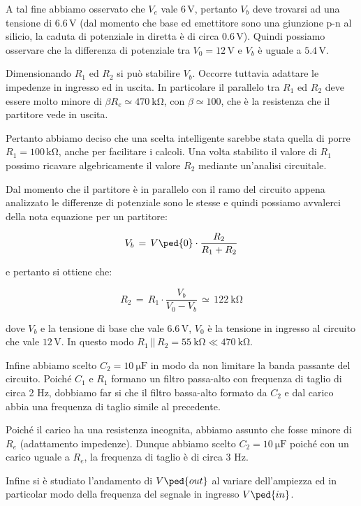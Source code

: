 A tal fine abbiamo osservato che $V_e$ vale $6\,\si{\volt}$, pertanto $V_b$ deve trovarsi ad una tensione di $6.6\,\si{\volt}$ (dal momento che base ed emettitore sono una giunzione p-n al silicio, la caduta di potenziale in diretta è di circa $0.6\,\si{\volt}$). Quindi possiamo osservare che la differenza di potenziale tra $V_0=12\,\si{\volt}$ e $V_b$ è uguale a $5.4\,\si{\volt}$.

Dimensionando $R_1$ ed $R_2$ si può stabilire $V_b$. Occorre tuttavia adattare le impedenze in ingresso ed in uscita. In particolare il parallelo tra $R_1$ ed $R_2$ deve essere molto minore di $\beta R_e \simeq \SI{470}{\kilo\ohm}$, con $\beta \simeq 100$, che è la resistenza che il partitore vede in uscita.

Pertanto abbiamo deciso che una scelta intelligente sarebbe stata quella di porre $R_1 = 100\,\si{\kilo\ohm}$, anche per facilitare i calcoli. Una volta stabilito il valore di $R_1$ possimo ricavare algebricamente il valore $R_2$ mediante un'analisi circuitale.

Dal momento che il partitore è in parallelo con il ramo del circuito appena analizzato le differenze di potenziale sono le stesse e quindi possiamo avvalerci della nota equazione per un partitore:

\begin{equation}
        V_b\,=\,V\ped{0}\cdot\frac{R_2}{R_1+R_2}
\end{equation}

e pertanto si ottiene che:

\begin{equation}
        R_2\,=\,R_1\cdot\frac{V_b}{V_0-V_b} \,\simeq\, \SI{122}{\kilo\ohm}
\end{equation}

dove $V_b$ e la tensione di base che vale $6.6\,\si{\volt}$, $V_0$ è la tensione in ingresso al circuito che vale $12\,\si{\volt}$. In questo modo $R_1\,||\,R_2 = \SI{55}{\kilo\ohm} \ll \SI{470}{\kilo\ohm}$.

Infine abbiamo scelto $C_2 = \SI{10}{\micro\farad}$ in modo da non limitare la banda passante del circuito. Poiché $C_1$ e $R_1$ formano un filtro passa-alto con frequenza di taglio di circa 2 Hz, dobbiamo far si che il filtro bassa-alto formato da $C_2$ e dal carico abbia una frequenza di taglio simile al precedente.

Poiché il carico ha una resistenza incognita, abbiamo assunto che fosse minore di $R_e$ (adattamento impedenze). Dunque abbiamo scelto $C_2 = \SI{10}{\micro\farad}$ poiché con un carico uguale a $R_e$, la frequenza di taglio è di circa 3 Hz.

Infine si è studiato l'andamento di $V\ped{out}$ al variare dell'ampiezza ed in particolar modo della frequenza del segnale in ingresso $V\ped{in}$.
